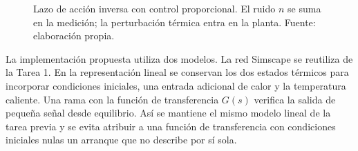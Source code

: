 \begin{figure}[!tbp]
\centering
{}
\caption{Lazo de acción inversa con control proporcional. El ruido $n$ se suma en la medición; la perturbación térmica entra en la planta. Fuente: elaboración propia.}
\label{fig:lazoP}
\end{figure}

La implementación propuesta utiliza dos modelos. La red Simscape se reutiliza de la Tarea 1. En la representación lineal se conservan los dos estados térmicos para incorporar condiciones iniciales, una entrada adicional de calor y la temperatura caliente. Una rama con la función de transferencia $G(s)$ verifica la salida de pequeña señal desde equilibrio. Así se mantiene el mismo modelo lineal de la tarea previa y se evita atribuir a una función de transferencia con condiciones iniciales nulas un arranque que no describe por sí sola.
